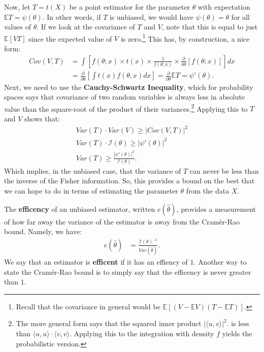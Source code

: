 \documentclass{tufte-handout}
\begin{document}
Now, let $T = t(X)$ be a point estimator for the parameter $\theta$ with
expectation $\mathbb{E}T = \psi(\theta)$. In other words, if $T$ is
unbiased, we would have $\psi(\theta) = \theta$ for all values of 
$\theta$. If we look at the covariance of $T$ and $V$, note that this
is equal to just $\mathbb{E}[VT]$ since the expected value of $V$ is zero.\footnote{
  Recall that the covariance in general would be $\mathbb{E}[(V - \mathbb{E}V)(T - \mathbb{E}T)]$.
} This has, by construction, a nice form:
\begin{align*}
Cov(V, T) &= \int \left[ f(\theta; x) \times t(x) \times \frac{1}{f(\theta; x)} \times \frac{\partial}{\partial \theta} \left[ f(\theta; x) \right] \right] dx \\
&= \frac{\partial}{\partial \theta} \left[ \int t(x) f(\theta, x) dx \right] = \frac{\partial}{\partial \theta} \mathbb{E}T = \psi'(\theta).
\end{align*}
Next, we need to use the \textbf{Cauchy-Schwartz Inequality}, which for
probability spaces says that covariance of two random variables is always
less in absolute value than the square-root of the product of their
variances.\footnote{
  The more general form says that the squared inner product $| \langle u, v\rangle |^2$.
  is less than $\langle u, u\rangle \cdot \langle v, v\rangle$. Applying this to
  the integration with density $f$ yields the probabilistic version.
} Applying this to $T$ and $V$ shows that:
\begin{align*}
Var(T) \cdot Var(V) \geq | Cov(V, T) |^2  \\
Var(T) \cdot \mathcal{I}(\theta) \geq | \psi'(\theta) |^2  \\
Var(T) \geq \frac{| \psi'(\theta) |^2}{\mathcal{I}(\theta)}.
\end{align*}
Which implies, in the unbiased case, that the variance of $T$ can never be
less than the inverse of the Fisher information. So, this provides a bound
on the best that we can hope to do in terms of estimating the parameter 
$\theta$ from the data $X$.

The \textbf{efficency} of an unbiased estimator, written $e(\widehat{\theta})$, 
provides a measurement of how far away the variance of the estimator is 
away from the Cramèr-Rao bound. Namely, we have:
\begin{align*}
e(\widehat{\theta}) &= \frac{\mathcal{I}(\theta)^{-1}}{Var(\widehat{\theta})}.
\end{align*}
We say that an estimator is \textbf{efficent} if it has an effiency of $1$.
Another way to state the Cramér-Rao bound is to simply say that the efficency
is never greater than $1$.
\end{document}

